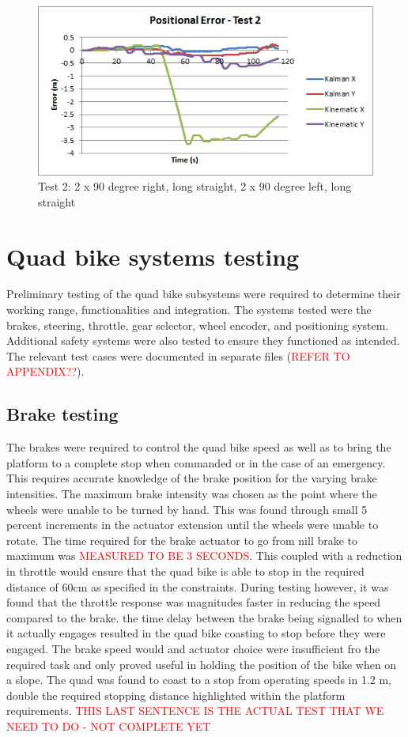 \documentclass[main.tex]{subfiles}
\begin{document}
\begin{figure}[ht]
\includegraphics[width=\textwidth]{5-Testing/position_error_test_2.png}
\centering
\caption[Positioning system test 2]{Test 2: 2 x 90 degree right, long straight, 2 x 90 degree left, long straight} 
\end{figure}

\section{Quad bike systems testing}
Preliminary testing of the quad bike subsystems were required to determine their working range, functionalities and integration. The systems tested were the brakes, steering, throttle, gear selector, wheel encoder, and positioning system. Additional safety systems were also tested to ensure they functioned as intended.
The relevant test cases were documented in separate files (\textcolor{red}{REFER TO APPENDIX??}).

\subsection{Brake testing}
The brakes were required to control the quad bike speed as well as to bring the platform to a complete stop when commanded or in the case of an emergency. This requires accurate knowledge of the brake position for the varying brake intensities. The maximum brake intensity was chosen as the point where the wheels were unable to be turned by hand. This was found through small 5 percent increments in the actuator extension until the wheels were unable to rotate. The time required for the brake actuator to go from nill brake to maximum was \textcolor{red}{MEASURED TO BE 3 SECONDS}. This coupled with a reduction in throttle would ensure that the quad bike is able to stop in the required distance of 60cm as specified in the constraints. During testing however, it was found that the throttle response was magnitudes faster in reducing the speed compared to the brake. the time delay between the brake being signalled to when it actually engages resulted  in the quad bike coasting to stop before they were engaged. The brake speed would and actuator choice were insufficient fro the required task and only proved useful in holding the position of the bike when on a slope. The quad was found to coast to a stop from operating speeds in 1.2 m, double the required stopping distance highlighted within the platform requirements.    \textcolor{red}{THIS LAST SENTENCE IS THE ACTUAL TEST THAT WE NEED TO DO - NOT COMPLETE YET}
\end{document}
